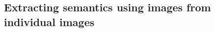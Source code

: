 \documentclass[10pt,journal,compsoc]{IEEEtran}
\begin{document}
%
%
%






\subsection{Extracting semantics using images from individual images}


\end{document}
